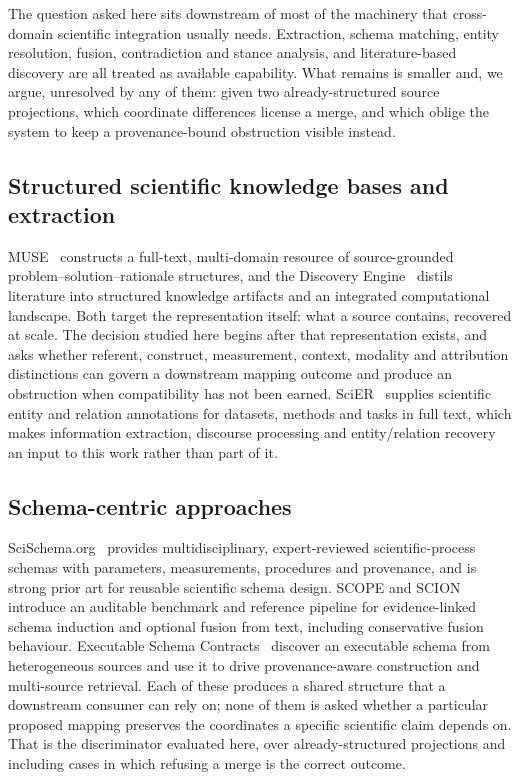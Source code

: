The question asked here sits downstream of most of the machinery that
cross-domain scientific integration usually needs. Extraction, schema
matching, entity resolution, fusion, contradiction and stance analysis, and
literature-based discovery are all treated as available capability. What
remains is smaller and, we argue, unresolved by any of them: given two
already-structured source projections, which coordinate differences license a
merge, and which oblige the system to keep a provenance-bound obstruction
visible instead.

\subsection{Structured scientific knowledge bases and extraction}

MUSE~\cite{muse2026} constructs a full-text, multi-domain resource of
source-grounded problem--solution--rationale structures, and the Discovery
Engine~\cite{discoveryEngine2025} distils literature into structured knowledge
artifacts and an integrated computational landscape. Both target the
representation itself: what a source contains, recovered at scale. The
decision studied here begins after that representation exists, and asks
whether referent, construct, measurement, context, modality and attribution
distinctions can govern a downstream mapping outcome and produce an
obstruction when compatibility has not been earned. SciER~\cite{scier2024}
supplies scientific entity and relation annotations for datasets, methods and
tasks in full text, which makes information extraction, discourse processing
and entity/relation recovery an input to this work rather than part of it.

\subsection{Schema-centric approaches}

SciSchema.org~\cite{scischema2026} provides multidisciplinary,
expert-reviewed scientific-process schemas with parameters, measurements,
procedures and provenance, and is strong prior art for reusable scientific
schema design. SCOPE and SCION~\cite{scopes2026} introduce an auditable
benchmark and reference pipeline for evidence-linked schema induction and
optional fusion from text, including conservative fusion behaviour. Executable
Schema Contracts~\cite{schemaContracts2026} discover an executable schema from
heterogeneous sources and use it to drive provenance-aware construction and
multi-source retrieval. Each of these produces a shared structure that a
downstream consumer can rely on; none of them is asked whether a particular
proposed mapping preserves the coordinates a specific scientific claim depends
on. That is the discriminator evaluated here, over already-structured
projections and including cases in which refusing a merge is the correct
outcome.

